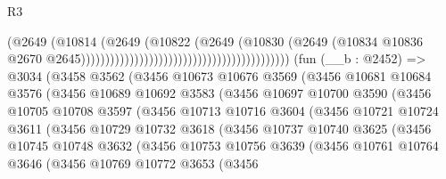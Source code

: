 \begin{lexlean}{R3}
\begin{coremodule}
                                                                          (@2649
                                                                            (@10814
                                                                              (@2649
                                                                                (@10822
                                                                                  (@2649
                                                                                    (@10830
                                                                                      (@2649
                                                                                        (@10834
                                                                                          @10836
                                                                                          @2670
                                                                                          @2645)))))))))))))))))))))))))))))))))))))))))))
    (fun (__b : @2452) =>
    @3034
      (@3458
        @3562
        (@3456
          @10673
          @10676
          @3569
          (@3456
            @10681
            @10684
            @3576
            (@3456
              @10689
              @10692
              @3583
              (@3456
                @10697
                @10700
                @3590
                (@3456
                  @10705
                  @10708
                  @3597
                  (@3456
                    @10713
                    @10716
                    @3604
                    (@3456
                      @10721
                      @10724
                      @3611
                      (@3456
                        @10729
                        @10732
                        @3618
                        (@3456
                          @10737
                          @10740
                          @3625
                          (@3456
                            @10745
                            @10748
                            @3632
                            (@3456
                              @10753
                              @10756
                              @3639
                              (@3456
                                @10761
                                @10764
                                @3646
                                (@3456
                                  @10769
                                  @10772
                                  @3653
                                  (@3456

\end{coremodule}
\end{lexlean}
